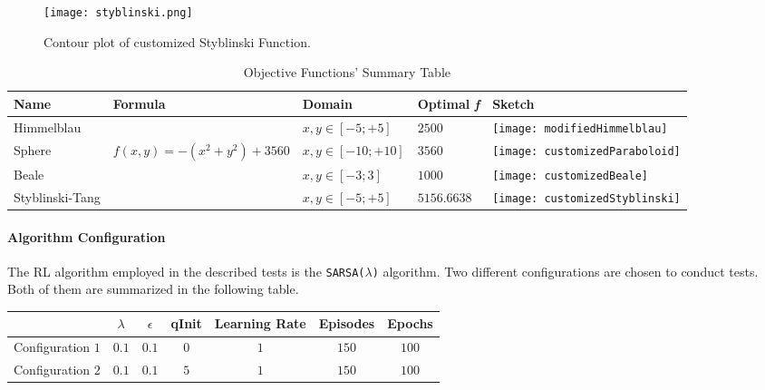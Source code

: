 \begin{figure}[h!]
	\centering
	\texttt{[image: styblinski.png]}
	\caption{Contour plot of customized Styblinski Function.}
	\label{fig:ContourStyblinskiFunction}
\end{figure}



	
\begin{sidewaystable}
	\centering
	\caption{Objective Functions'  Summary Table}
	\begin{tabular}
		{l l l l l} \hline Name & Formula & Domain & Optimal \textit{f} & Sketch \\
		\hline Himmelblau & \vtop{\hbox{\strut $f(x, y) = - ((x^2 + y -11)^2+$}\hbox{\strut $+(x + y^2 - 7)^2) + 2500$}} & $x, y \in [-5;+5]$ & $2500$ & \parbox[c]{1em}{
			\texttt{[image: modifiedHimmelblau]}} \\
		Sphere & $f(x, y) = -(x^2 + y^2) + 3560$ &$x, y \in [-10;+10]$ & $3560$ & \parbox[c]{1em}{
			\texttt{[image: customizedParaboloid]}} \\
		Beale &  &$x, y \in [-3;3]$ & $1000$ & \parbox[c]{1em}{
			\texttt{[image: customizedBeale]}} \\
		Styblinski-Tang &  &$x, y \in [-5;+5]$ & $5156.6638$ & \parbox[c]{1em}{
			\texttt{[image: customizedStyblinski]}} \\
		\hline
	\end{tabular}
\end{sidewaystable}

\pagebreak

\paragraph{Algorithm Configuration} The RL algorithm employed in the described tests is the {\tt SARSA($\lambda$)} algorithm. Two different configurations are chosen to conduct tests. Both of them are summarized in the following table.

\begin{table} [h!]
	\centering	
	\begin{tabular}{|c|c|c|c|c|c|c|}
		\hline 
		& $\lambda$  & $\epsilon$ & qInit & Learning Rate  & Episodes  & Epochs \\ 
		\hline Configuration $1$
		& $0.1$ & $0.1$ & $0$ & $1$  & $150$ & $100$  \\ 
		\hline Configuration $2$
		& $0.1$ & $0.1$ & $5$ & $1$  & $150$ & $100$  \\ 
		\hline
	\end{tabular} 
\end{table}

